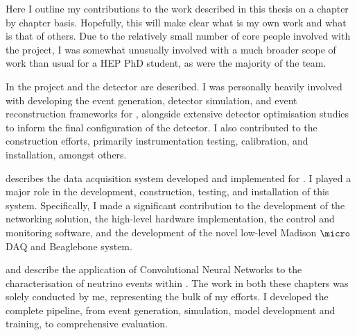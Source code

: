 \begin{preface}
    Here I outline my contributions to the work described in this thesis on a chapter by chapter
    basis. Hopefully, this will make clear what is my own work and what is that of others. Due to
    the relatively small number of core people involved with the \chips project, I was somewhat
    unusually involved with a much broader scope of work than usual for a HEP PhD student, as were
    the majority of the \chips team.

    In  the \chips project and the \chipsfive detector are described. I was
    personally heavily involved with developing the event generation, detector simulation, and
    event reconstruction frameworks for \chips, alongside extensive detector optimisation studies
    to inform the final configuration of the \chipsfive detector. I also contributed to the
    \chipsfive construction efforts, primarily instrumentation testing, calibration, and
    installation, amongst others.

     describes the data acquisition system developed and implemented for
    \chipsfive. I played a major role in the development, construction, testing, and installation
    of this system. Specifically, I made a significant contribution to the development of the
    networking solution, the high-level hardware implementation, the control and monitoring
    software, and the development of the novel low-level Madison $\micro$DAQ and Beaglebone
    system.

     and  describe the application of Convolutional
    Neural Networks to the characterisation of neutrino events within \chipsfive. The work in both
    these chapters was solely conducted by me, representing the bulk of my efforts. I developed
    the complete pipeline, from event generation, simulation, model development and training, to
    comprehensive evaluation.
\end{preface}

\tableofcontents %